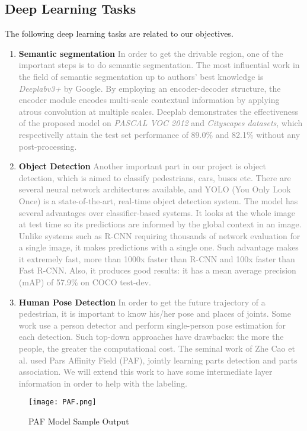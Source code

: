 \subsection{Deep Learning Tasks}
The following deep learning tasks are related to our objectives.
\begin{enumerate}
    \item \textbf{Semantic segmentation}\newline
\textcolor{gray}{In order to get the drivable region, one of the important
steps is to do semantic segmentation.  The most influential work in the field
of semantic segmentation up to authors' best knowledge is \textit{Deeplabv3+}
by Google. By employing an encoder-decoder structure, the encoder module
encodes multi-scale contextual information by
applying atrous convolution at multiple scales. Deeplab demonstrates the
effectiveness of the proposed model on \textit{PASCAL VOC 2012} and
\textit{Cityscapes datasets}, which respectivelly attain the test set
performance of 89.0\% and 82.1\% without any post-processing.
\cite{Chen2018DeepLab}}

\item \textbf{Object Detection}\newline
\textcolor{gray}{Another important part in our project is object detection,
which is aimed to classify pedestrians, cars, buses etc. There are several
neural network architectures available, and YOLO (You Only Look Once)
\cite{Redmon2018YOLOv3} is a state-of-the-art, real-time object detection
system.
The model has several advantages over classifier-based systems. It looks at the
whole image at test time so its predictions are informed by the global context
in an image. Unlike systems such as R-CNN requiring thousands of network
evaluation for a single image, it makes predictions with a single one. Such
advantage makes it extremely fast, more than 1000x faster than R-CNN and 100x
faster than Fast R-CNN. Also, it produces good results: it has a mean average
precision (mAP) of 57.9\% on COCO test-dev. }

\item \textbf{Human Pose Detection}\newline
\textcolor{gray}{In order to get the future trajectory of a pedestrian, it is
important to know his/her pose and places of joints. Some work use a person
detector and perform single-person pose estimation for each detection. Such
top-down approaches have drawbacks: the more the people, the greater the
computational cost. The
seminal work of Zhe Cao et al. \cite{Cao2016Realtime} used Pars Affinity Field
(PAF), jointly learning parts detection and parts association. We will extend
this work to have some intermediate layer information in order to help with the
labeling. }
\end{enumerate}

\begin{figure}[h!]
  \centering \texttt{[image: PAF.png]}
  \caption{PAF Model Sample Output}
  \label{fig:PAF}
\end{figure}
